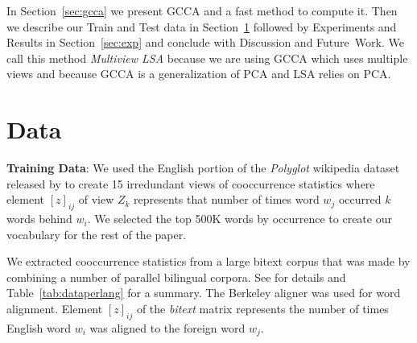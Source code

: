 \documentclass[11pt]{article}
\begin{document}

In Section~\ref{sec:gcca} we present GCCA and a fast method to
compute it. 
Then we describe our Train and Test data in
Section~\ref{sec:data} followed by Experiments and Results in
Section~\ref{sec:exp} and conclude with Discussion and Future~Work. 
We call this method \textit{Multiview LSA} because we are using GCCA
which uses multiple views and because GCCA is a generalization of PCA and LSA
relies on PCA. 

\section{Data}
\label{sec:data}
\noindent\textbf{Training Data}: We used the English portion of the \textit{Polyglot} wikipedia dataset
released by \cite{al2013polyglot} to create 15 irredundant views of
cooccurrence statistics where element $[z]_{ij}$ of view $Z_k$
represents that number of times word $w_j$ occurred $k$ words behind
$w_i$.
We selected the top 500K words by occurrence to 
create our vocabulary for the rest of the paper.

We extracted cooccurrence statistics from a large bitext corpus that was made by combining a
number of parallel bilingual corpora. See \cite{ganitkevitch2013ppdb} for details and
Table~\ref{tab:dataperlang} for a summary. The Berkeley aligner was used for word alignment. Element
$[z]_{ij}$ of the \textit{bitext} matrix represents the number of times English
word $w_i$ was aligned to the foreign word $w_j$.
\end{document}
